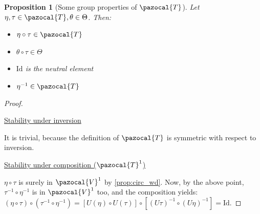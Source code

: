 \documentclass[english,a4paper,12pt,oneside]{scrbook}
\theoremstyle{break}
\newtheorem{prop}[equation]{Proposition}
\newenvironment{mproof}[1][\proofname]{%
  \begin{proof}[#1]$ $\par\nobreak\ignorespaces
}{%
  \end{proof}
}
\renewcommand*{\proofname}{Proof}
\theoremstyle{remark}
\newcommand{\mR}{\mathbb{R}}
\newcommand{\cV}{\pazocal{V}}
\newcommand{\cT}{\pazocal{T}}
\newcommand{\id}{\text{Id}}
\newcommand{\te}{\theta}
\newcommand{\Te}{\Theta}
\begin{document}
\begin{prop}[Some group properties of $\cT$]
\label{prop:group}
Let $\eta, \tau \in \cT, \te \in \Te$. Then:

\begin{itemize}
	\item $\eta \circ \tau \in \cT$
	\item $\te \circ \tau \in \Te$
	\item $\id$ is the neutral element
	\item $\eta^{-1} \in \cT$
\end{itemize}

\end{prop}
\begin{mproof}

%
%
%
%
%

\underline{Stability under inversion}

It is trivial, because the definition of $\cT$ is symmetric with respect to inversion.

\underline{Stability under composition ($\cT^1$)}

$\eta \circ \tau$ is surely in $\cV^1$ by \cref{prop:circ_wd}. Now, by the above point, $\tau^{-1} \circ \eta^{-1}$ is in $\cV^1$ too, and the composition yields: $(\eta \circ \tau)\circ (\tau^{-1} \circ \eta^{-1}) = [U(\eta)\circ U(\tau)]\circ [(U\tau)^{-1} \circ (U\eta)^{-1}] = \id$.

\end{mproof}
\end{document}
